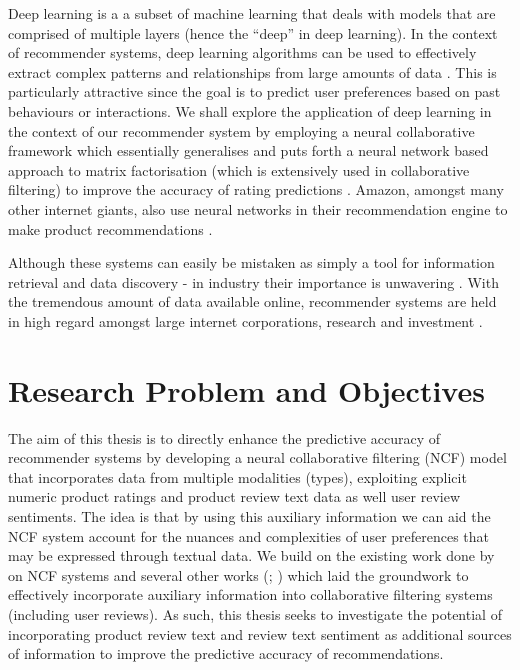Deep learning is a a subset of machine learning that deals with models that are comprised of multiple layers (hence the “deep” in deep learning). In the context of recommender systems, deep learning algorithms can be used to effectively extract complex patterns and relationships from large amounts of data \cite{he2017neural}. This is particularly attractive since the goal is to predict user preferences based on past behaviours or interactions. We shall explore the application of deep learning in the context of our recommender system by employing a neural collaborative framework which essentially generalises and puts forth a neural network based approach to matrix factorisation (which is extensively used in collaborative filtering) to improve the accuracy of rating predictions \cite{he2017neural}. Amazon, amongst many other internet giants, also use neural networks in their recommendation engine to make product recommendations \cite{steck2021deep}. 

Although these systems can easily be mistaken as simply a tool for information retrieval and data discovery - in industry their importance is unwavering \cite{he2017neural}. With the tremendous amount of data available online, recommender systems are held in high regard amongst large internet corporations, research and investment \cite{steck2021deep}. 

\section{Research Problem and Objectives}
\label{sec:1 Research Problem and Objectives}

The aim of this thesis is to directly enhance the predictive accuracy of recommender systems by developing a neural collaborative filtering (NCF) model that incorporates data from multiple modalities (types), exploiting explicit numeric product ratings and product review text data as well user review sentiments. The idea is that by using this auxiliary information we can aid the NCF system account for the nuances and complexities of user preferences that may be expressed through textual data. We build on the existing work done by \cite{he2017neural} on NCF systems and several other works (\cite{srifi2020recommender}; \cite{zhang2014urcf}) which laid the groundwork to effectively incorporate auxiliary information into collaborative filtering systems (including user reviews). As such, this thesis seeks to investigate the potential of incorporating product review text and review text sentiment as additional sources of information to improve the predictive accuracy of recommendations. 

